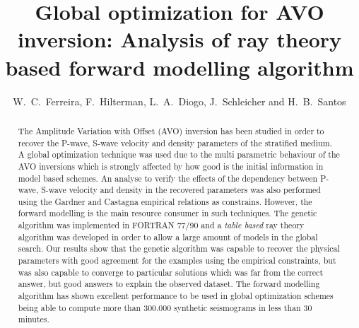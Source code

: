 \documentclass{vie16}
\begin{document}
\title{Global optimization for AVO inversion: Analysis of ray theory based 
forward modelling algorithm}
\author{W.~C.~Ferreira, F.~Hilterman, L.~A.~Diogo, J.~Schleicher and 
H.~B.~Santos}
\maketitle


\begin{abstract}
The Amplitude Variation with Offset (AVO) inversion has been studied in 
order to recover the P-wave, S-wave velocity and density parameters of the 
stratified medium. A global optimization technique was used due to the 
multi parametric behaviour of the AVO inversions which is strongly affected 
by how good is the initial information in model based schemes. An analyse 
to verify the effects of the dependency between P-wave, S-wave velocity 
and density in the recovered parameters was also performed using the 
Gardner and Castagna empirical relations as constrains. However, the 
forward modelling is the main resource consumer in such techniques. The 
genetic algorithm was implemented in FORTRAN 77/90  and a \textit{table 
based} ray theory algorithm was developed in order to allow a large amount 
of models in the global search. Our results show that the genetic algorithm 
was capable to recover the physical parameters with good agreement for the 
examples using the empirical constraints, but was also capable to converge 
to particular solutions which was far from the correct answer, but good 
answers to explain the observed dataset. The forward modelling algorithm 
has shown excellent performance to be used in global optimization schemes 
being able to compute more than 300.000 synthetic seismograms in less 
than 30 minutes.
\end{abstract}

\newpage
\end{document}
